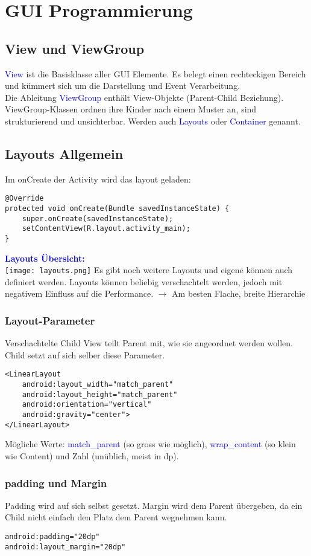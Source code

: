 
\section{GUI Programmierung}
\subsection{View und ViewGroup}
\textcolor{blue}{View} ist die Basisklasse aller GUI Elemente. Es belegt einen rechteckigen Bereich und kümmert sich um die Darstellung und Event Verarbeitung.\\
Die Ableitung \textcolor{blue}{ViewGroup} enthält View-Objekte (Parent-Child Beziehung). ViewGroup-Klassen ordnen ihre Kinder nach einem Muster an, sind strukturierend und unsichterbar. Werden auch \textcolor{blue}{Layouts} oder \textcolor{blue}{Container} genannt.
\subsection{Layouts Allgemein}
Im onCreate der Activity wird das layout geladen:
\begin{lstlisting}
@Override
protected void onCreate(Bundle savedInstanceState) {
    super.onCreate(savedInstanceState);
    setContentView(R.layout.activity_main);
}
\end{lstlisting}
\textbf{\textcolor{blue}{Layouts Übersicht:}}\\
\texttt{[image: layouts.png]}
Es gibt noch weitere Layouts und eigene können auch definiert werden. Layouts können beliebig verschachtelt werden, jedoch mit negativem Einfluss auf die Performance. $\rightarrow$ Am besten Flache, breite Hierarchie
\subsubsection{Layout-Parameter}
Verschachtelte Child View teilt Parent mit, wie sie angeordnet werden wollen. Child setzt auf sich selber diese Parameter.
\begin{lstlisting}
<LinearLayout
    android:layout_width="match_parent"
    android:layout_height="match_parent"
    android:orientation="vertical"
    android:gravity="center">
</LinearLayout>
\end{lstlisting}
Mögliche Werte: \textcolor{blue}{match\_parent} (so gross wie möglich), \textcolor{blue}{wrap\_content} (so klein wie Content) und Zahl (unüblich, meist in dp).
\subsubsection{padding und Margin}
Padding wird auf sich selbst gesetzt. Margin wird dem Parent übergeben, da ein Child nicht einfach den Platz dem Parent wegnehmen kann.
\begin{lstlisting}
android:padding="20dp"
android:layout_margin="20dp"
\end{lstlisting}
